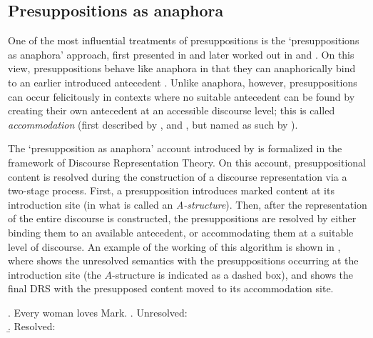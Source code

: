 
\subsection{Presuppositions as anaphora}

One of the most influential treatments of presuppositions is the
`presuppositions as anaphora' approach, first presented in
 and later worked out in
 and
. On this view, presuppositions behave
like anaphora in that they can anaphorically bind to an earlier introduced
antecedent . Unlike anaphora, however, presuppositions can occur felicitously in
contexts where no suitable antecedent can be found by creating their own
antecedent at an accessible discourse level; this is called
\emph{accommodation} (first described by
, and
, but named as such by
).

The `presupposition as anaphora' account introduced by
 is formalized in the framework of
Discourse Representation Theory.
On this account, presuppositional content is resolved during the
construction of a discourse representation via a two-stage process. First,
a presupposition introduces marked content at its introduction site (in what
is called an \emph{A-structure}). Then, after the representation of the
entire discourse is constructed, the presuppositions are resolved by either
binding them to an available antecedent, or accommodating them at a suitable
level of discourse. An example of the working of this algorithm is shown in
\Next, where \Next[a] shows the unresolved semantics with the
presuppositions occurring at the introduction site (the $A$-structure is
indicated as a dashed box), and \Next[b] shows the final DRS with the
presupposed content moved to its accommodation site.  

\begin{multicols}{2}
\ex. Every woman loves Mark. %
\a. Unresolved:\\
  \columnbreak
  \b. \vspace*{0.1cm} Resolved:\\

\end{multicols}

